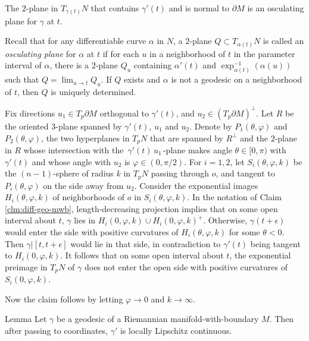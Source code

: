   
\begin{clm}{}\label{clm:C^1-geo-mwb}
 The $2$-plane in $T_{\gamma(t)}N$ that contains $\gamma'(t)$ and is normal to $\partial M$ is an osculating plane for $\gamma$ at $t$.
\end{clm}

Recall that for any differentiable curve $\alpha$ in $N$, a $2$-plane $Q\subset T_{\alpha(t)}N$ is called  an \emph{osculating plane} for $\alpha$ at $t$ if for each $u$ in a neighborhood of $t$ in the parameter interval of $\alpha$, there is a  $2$-plane $Q_u$ containing $\alpha'(t)$ and $\exp _{\alpha(t)}^{-1} (\alpha(u))$ such that $Q=\lim_{u\to t}Q_u$.  If $Q$ exists and $\alpha$ is not a geodesic on a neighborhood of $t$,  then $Q$ is uniquely determined. 

Fix directions $u_1\in T_p\partial M$  orthogonal to $\gamma'(t)$, and $u_2\in  (T_p\partial M)^\perp$.  Let $R$ be the oriented $3$-plane  spanned by $\gamma'(t)$, $u_1$ and $u_2$.  Denote by $P_1(\theta,\varphi)$ and $P_2(\theta,\varphi)$, the two hyperplanes in $T_pN$ that are spanned by $R^\perp$ and  the $2$-plane in $R$ whose intersection with  the $\,\gamma'(t)\,u_1\,$-plane makes angle $\theta\in [0,\pi)$ with $\gamma'(t)$ and whose angle with $u_2$ is $\varphi\in (0,\pi/2)$.
For $i=1,2$, let $S_i(\theta, \varphi, k)$ be the $(n-1)$-sphere of radius $k$ in $T_pN$ passing through $o$, and  tangent to $P_i(\theta,\varphi)$ on the side away from $u_2$.  Consider the exponential images $H_i(\theta, \varphi, k)$  of  neighborhoods of $o$ in $S_i(\theta, \varphi, k)$.  
In the notation of Claim \ref{clm:diff-geo-mwb}, length-decreasing projection implies that on some open interval about $t$, $\gamma$ lies in $H_i(0, \varphi, k)\cup H_i(0, \varphi, k)^+$.  Otherwise, $\gamma(t+\epsilon)$ would enter the side with positive curvatures of $H_i(\theta, \varphi, k)$ for some $\theta<0$.  Then $\gamma|[t, t+\epsilon]$ would lie in that side, in contradiction to $\gamma'(t)$ being tangent to $H_i(0, \varphi, k)$.  It follows that on some open interval about $t$, the exponential preimage in $T_pN$ of $\gamma$  does not enter the open side with positive curvatures of $S_i(0,\varphi, k)$.

Now the claim follows by letting $\varphi\to 0$ and $k\to\infty$.
\qeds

\begin{thm}{Lemma}\label{lem:abs-cont}
Let $\gamma$ be a geodesic of a Riemannian manifold-with-boundary $M$. Then after passing to coordinates, 
$\gamma'$  is  locally Lipschitz continuous.  
\end{thm}

